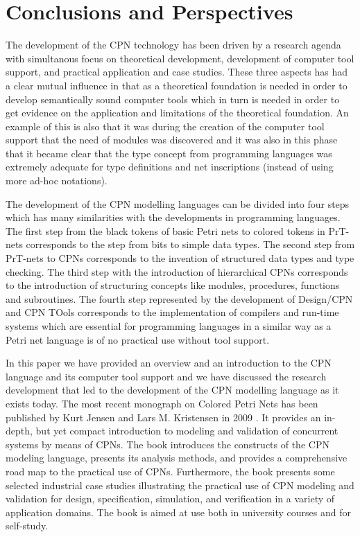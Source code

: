 \section{Conclusions and Perspectives}

The development of the CPN technology has been driven by a research
agenda with simultanous focus on theoretical development, development
of computer tool support, and practical application and case
studies. These three aspects has had a clear mutual influence in that
as a theoretical foundation is needed in order to develop semantically
sound computer tools which in turn is needed in order to get evidence
on the application and limitations of the theoretical foundation. An
example of this is also that it was during the creation of the
computer tool support that the need of modules was discovered and it
was also in this phase that it became clear that the type concept from
programming languages was extremely adequate for type definitions and
net inscriptions (instead of using more ad-hoc notations).

The development of the CPN modelling languages can be divided into
four steps which has many similarities with the developments in
programming languages. The first step from the black tokens of basic
Petri nets to colored tokens in PrT-nets corresponds to the step from
bits to simple data types. The second step from PrT-nets to CPNs
corresponds to the invention of structured data types and type
checking. The third step with the introduction of hierarchical CPNs
corresponds to the introduction of structuring concepts like modules,
procedures, functions and subroutines. The fourth step represented by
the development of Design/CPN and CPN TOols corresponds to the
implementation of compilers and run-time systems which are essential
for programming languages in a similar way as a Petri net language is
of no practical use without tool support.

In this paper we have provided an overview and an introduction to the
CPN language and its computer tool support and we have discussed the
research development that led to the development of the CPN modelling
language as it exists today. The most recent monograph on Colored
Petri Nets has been published by Kurt Jensen and Lars M. Kristensen in
2009 \cite{newcpnbook}. It provides an in-depth, but yet compact
introduction to modeling and validation of concurrent systems by means
of CPNs. The book introduces the constructs of the CPN modeling
language, presents its analysis methods, and provides a comprehensive
road map to the practical use of CPNs. Furthermore, the book presents
some selected industrial case studies illustrating the practical use
of CPN modeling and validation for design, specification, simulation,
and verification in a variety of application domains. The book is
aimed at use both in university courses and for self-study.



